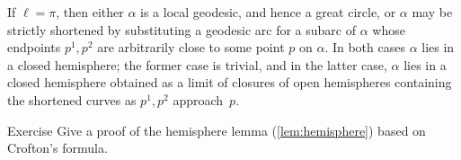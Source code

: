 If $\ell=\pi$, then either $\alpha$ is a local geodesic, and hence a great circle, 
or $\alpha$ may be strictly shortened by substituting a geodesic arc for a subarc of $\alpha$ 
whose endpoints $p^1,p^2$ are arbitrarily close to some point $p$ on $\alpha$.
In both cases $\alpha$ lies in a closed hemisphere;
the former case is trivial, and in the latter case, $\alpha$ lies in a closed hemisphere obtained as a limit of closures of open hemispheres containing the shortened curves as $p^1,p^2$ approach~$p$.
\qeds


\begin{thm}{Exercise}\label{exr-crofton}
Give a proof of the hemisphere lemma (\ref{lem:hemisphere}) based on Crofton's formula.
\end{thm}


